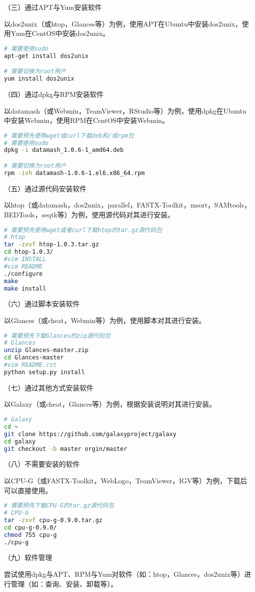 \vspace{0.1in}
（三）通过APT与Yum安装软件

以dos2unix（或htop，Glances等）为例，使用APT在Ubuntu中安装dos2unix，使用Yum在CentOS中安装dos2unix。
\begin{lstlisting}[language=bash]
# 需要使用sudo
apt-get install dos2unix

# 需要切换为root用户
yum install dos2unix
\end{lstlisting}

\vspace{0.1in}
（四）通过dpkg与RPM安装软件

以datamash（或Webmin，TeamViewer，RStudio等）为例，使用dpkg在Ubuntu中安装Webmin，使用RPM在CentOS中安装Webmin。
\begin{lstlisting}[language=bash]
# 需要预先使用wget或curl下载deb和/或rpm包
# 需要使用sudo
dpkg -i datamash_1.0.6-1_amd64.deb

# 需要切换为root用户
rpm -ivh datamash-1.0.6-1.el6.x86_64.rpm
\end{lstlisting}

\vspace{0.1in}
（五）通过源代码安装软件

以htop（或datamash，dos2unix，parallel，FASTX-Toolkit，msort，SAMtools，BEDTools，seqtk等）为例，使用源代码对其进行安装。
\begin{lstlisting}[language=bash]
# 需要预先使用wget或者curl下载htop的tar.gz源代码包
# htop
tar -zxvf htop-1.0.3.tar.gz
cd htop-1.0.3/
#vim INSTALL
#vim README
./configure
make
make install
\end{lstlisting}

\vspace{0.1in}
（六）通过脚本安装软件

以Glances（或cheat，Webmin等）为例，使用脚本对其进行安装。
\begin{lstlisting}[language=bash]
# 需要预先下载Glances的zip源代码包
# Glances
unzip Glances-master.zip
cd Glances-master
#vim README.rst
python setup.py install
\end{lstlisting}

\vspace{0.1in}
（七）通过其他方式安装软件

以Galaxy（或cheat，Glances等）为例，根据安装说明对其进行安装。
\begin{lstlisting}[language=bash]
# Galaxy
cd ~
git clone https://github.com/galaxyproject/galaxy
cd galaxy
git checkout -b master orgin/master
\end{lstlisting}

\vspace{0.1in}
（八）不需要安装的软件

以CPU-G（或FASTX-Toolkit，WebLogo，TeamViewer，IGV等）为例，下载后可以直接使用。
\begin{lstlisting}[language=bash]
# 需要预先下载CPU-G的tar.gz源代码包
# CPU-G
tar -zxvf cpu-g-0.9.0.tar.gz
cd cpu-g-0.9.0/
chmod 755 cpu-g
./cpu-g
\end{lstlisting}

\vspace{0.1in}
（九）软件管理

尝试使用dpkg与APT、RPM与Yum对软件（如：htop，Glances，dos2unix等）进行管理（如：查询、安装、卸载等）。


